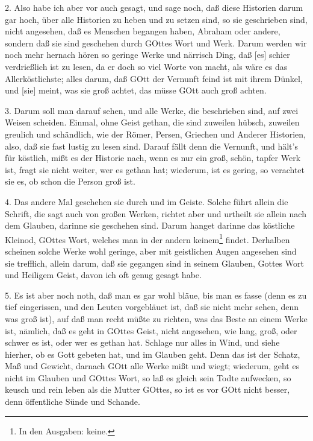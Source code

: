 2. Also habe ich aber vor auch gesagt, und sage noch, daß diese Historien darum gar hoch, über alle Historien zu heben und zu setzen sind, so sie geschrieben sind, nicht angesehen, daß es Menschen begangen haben, Abraham oder andere, sondern daß sie sind geschehen durch GOttes Wort und Werk. Darum werden wir noch mehr hernach hören so geringe Werke und närrisch Ding, daß [es] schier verdrießlich ist zu lesen, da er doch so viel Worte von macht, als wäre es das Allerköstlichste; alles darum, daß GOtt der Vernunft feind ist mit ihrem Dünkel, und [sie] meint, was sie groß achtet, das müsse GOtt auch groß achten.

3. Darum soll man darauf sehen, und alle Werke, die beschrieben sind, auf zwei Weisen scheiden. Einmal, ohne Geist gethan, die sind zuweilen hübsch, zuweilen greulich und schändlich, wie der Römer, Persen, Griechen und Anderer Historien, also, daß sie fast lustig zu lesen sind. Darauf fällt denn die Vernunft, und hält’s für köstlich, mißt es der Historie nach, wenn es nur ein groß, schön, tapfer Werk ist, fragt sie nicht weiter, wer es gethan hat; wiederum, ist es gering, so verachtet sie es, ob schon die Person groß ist.

4. Das andere Mal geschehen sie durch und im Geiste. Solche führt allein die Schrift, die sagt auch von großen Werken, richtet aber und urtheilt sie allein nach dem Glauben, darinne sie geschehen sind. Darum hanget darinne das köstliche Kleinod, GOttes Wort, welches man in der andern keinem\footnote{In den Ausgaben: keine.} findet. Derhalben scheinen solche Werke wohl geringe, aber mit geistlichen Augen angesehen sind sie trefflich, allein darum, daß sie gegangen sind in seinem Glauben, Gottes Wort und Heiligem Geist, davon ich oft genug gesagt habe.

5. Es ist aber noch noth, daß man es gar wohl bläue, bis man es fasse (denn es zu tief eingerissen, und den Leuten vorgebläuet ist, daß sie nicht mehr sehen, denn was groß ist), auf daß man recht müßte zu richten, was das Beste an einem Werke ist, nämlich, daß es geht in GOttes Geist, nicht angesehen, wie lang, groß, oder schwer es ist, oder wer es gethan hat. Schlage nur alles in Wind, und siehe hierher, ob es Gott gebeten hat, und im Glauben geht. Denn das ist der Schatz, Maß und Gewicht, darnach GOtt alle Werke mißt und wiegt; wiederum, geht es nicht im Glauben und GOttes Wort, so laß es gleich sein Todte aufwecken, so keusch und rein leben als die Mutter GOttes, so ist es vor GOtt nicht besser, denn öffentliche Sünde und Schande.


